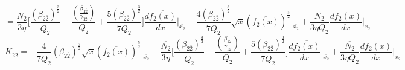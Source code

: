 \documentclass[fleqn, 10pt]{article}
\begin{document}
            \begin{equation*}
                = \frac{\overline{N_2}}{3\eta} \biggl[\frac{(\beta_{2\overline{2}})^\frac{3}{2}}{\overline{Q_2}}-\frac{\left(\frac{\beta_{1\overline{2}}}{\gamma_{12}}\right)}{Q_2} +  \frac{5(\beta_{2\overline{2}})^\frac{3}{2}}{7\overline{Q_2}}\biggr]\frac{d\overline{f_2(x)}}{dx} \Bigg|_{\overline{x_2}}-  \frac{4(\beta_{2\overline{2}})^\frac{3}{2}}{7\overline{Q_2}}\sqrt{x} (\overline{f_2(x)})^\frac{5}{2}\Bigg|_{\overline{x_2}}+   \frac{\overline{N_2}}{3\eta Q_2} \frac{df_2(x)}{dx}\Bigg|_{x_2}
            \end{equation*}
            \begin{equation}
                K_{\overline{2}2} = -   \frac{4}{7\overline{Q_2}}(\beta_{2\overline{2}})^\frac{3}{2}\sqrt{x}(\overline{f_2(x)})^\frac{5}{2}\Bigg|_{\overline{x_2}}+\frac{\overline{N_2}}{3\eta} \biggl[\frac{(\beta_{2\overline{2}})^\frac{3}{2}}{\overline{Q_2}}-\frac{\left(\frac{\beta_{1\overline{2}}}{\gamma_{12}}\right)}{Q_2} +  \frac{5(\beta_{2\overline{2}})^\frac{3}{2}}{7\overline{Q_2}}\biggr]\frac{d\overline{f_2(x)}}{dx}\Bigg|_{\overline{x_2}} +   \frac{\overline{N_2}}{3\eta Q_2} \frac{df_2(x)}{dx}\Bigg|_{x_2}
                \label{43}
            \end{equation}
\end{document}
